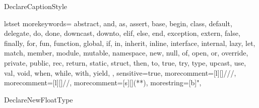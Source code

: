 
\theoremstyle{plain}
\newtheorem{thm}{Theorem}
\newtheorem{lemma}[thm]{Lemma}
\newtheorem{claim}[thm]{Claim}
\newtheorem{defn}{Definition}

\theoremstyle{remark}
\newtheorem*{cor}{Corollary}
\newtheorem*{rem}{Remark}
\newtheorem*{example}{Example}


\ifcsname DeclareCaptionStyle\endcsname
	\captionsetup{style=thesis}
	\captionsetup[algorithm]{style=thesis,singlelinecheck=off}
	\captionsetup[listing]{style=thesis,singlelinecheck=off}
\fi


\ifcsname lstset\endcsname
	{morekeywords={
				abstract, and, as, assert, base, begin, class, default, delegate, do,
				done, downcast, downto, elif, else, end, exception, extern, false,
				finally, for, fun, function, global, if, in, inherit, inline, interface,
				internal, lazy, let, match, member, module, mutable, namespace, new,
				null, of, open, or, override, private, public, rec, return, static,
				struct, then, to, true, try, type, upcast, use, val, void, when, while,
				with, yield,
			},
		sensitive=true,
		morecomment=[l][\color{green!50!black}]{///},
		morecomment=[l][\color{green!50!black}]{//},
		morecomment=[s][\color{green!50!black}]{(*}{*)},
		morestring=[b]{"},
	}
	\fi

\ifcsname DeclareNewFloatType\endcsname
\fi

\newcommand{\R}{\mathbb{R}}
\newcommand{\N}{\mathbb{N}}


